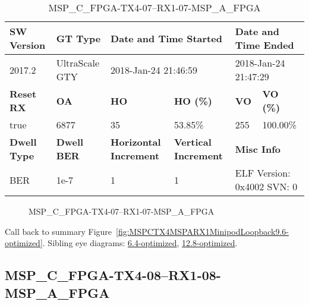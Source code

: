 \begin{table}[h]
\centering
\caption{MSP\_C\_FPGA-TX4-07--RX1-07-MSP\_A\_FPGA}
\label{tab:MSPCFPGATX407RX107MSPAFPGA9.6-optimized}
\begin{tabular}{@{}|l|l|l|l|l|l|@{}}
\toprule
\textbf{SW Version}                & \textbf{GT Type}   & \multicolumn{2}{l|}{\textbf{Date and Time Started}}            & \multicolumn{2}{l|}{\textbf{Date and Time Ended}}        \\ \midrule
2017.2                       & UltraScale GTY          & \multicolumn{2}{l|}{2018-Jan-24 21:46:59}                   & \multicolumn{2}{l|}{2018-Jan-24 21:47:29}               \\ \midrule
\textbf{Reset RX}                  & \textbf{OA} & \textbf{HO}   & \textbf{HO (\%)} & \textbf{VO} & \textbf{VO (\%)} \\ \midrule
true & 6877        & 35          & 53.85\%        & 255        & 100.00\%       \\ \midrule
\textbf{Dwell Type}                & \textbf{Dwell BER} & \textbf{Horizontal Increment} & \textbf{Vertical Increment}    & \multicolumn{2}{l|}{\textbf{Misc Info}}                  \\ \midrule
BER                            & 1e-7        & 1        & 1           & \multicolumn{2}{l|}{ELF Version: 0x4002 SVN: 0}                         \\ \bottomrule
\end{tabular}
\end{table}

\begin{figure}[h]
\caption{MSP\_C\_FPGA-TX4-07--RX1-07-MSP\_A\_FPGA} \label{fig:MSPCFPGATX407RX107MSPAFPGA9.6-optimized}
\end{figure}

Call back to summary Figure~\ref{fig:MSPCTX4MSPARX1MinipodLoopback9.6-optimized}.
Sibling eye diagrams: \hyperref[sec:MSPCFPGATX407RX107MSPAFPGA6.4-optimized]{6.4-optimized}, \hyperref[sec:MSPCFPGATX407RX107MSPAFPGA12.8-optimized]{12.8-optimized}.

\clearpage
\newpage


\subsection{MSP\_C\_FPGA-TX4-08--RX1-08-MSP\_A\_FPGA}\label{sec:MSPCFPGATX408RX108MSPAFPGA9.6-optimized}

